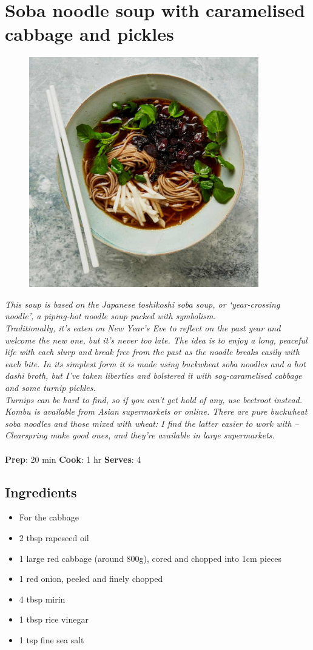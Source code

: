 \documentclass{book}
\begin{document}
\section{Soba noodle soup with caramelised cabbage and pickles}
\begin{figure}
\centering\includegraphics[width=10cm,height=10cm,keepaspectratio]{Recipe_Pictures/Soba_noodle_soup_with_caramelised_cabbage_and_pickles.png}
\end{figure}
\emph{This soup is based on the Japanese toshikoshi soba soup, or ‘year-crossing noodle’, a piping-hot noodle soup packed with symbolism.\\ 
Traditionally, it’s eaten on New Year’s Eve to reflect on the past year and welcome the new one, but it’s never too late. The idea is to enjoy a long, peaceful life with each slurp and break free from the past as the noodle breaks easily with each bite. In its simplest form it is made using buckwheat soba noodles and a hot dashi broth, but I’ve taken liberties and bolstered it with soy-caramelised cabbage and some turnip pickles.\\ 
Turnips can be hard to find, so if you can’t get hold of any, use beetroot instead. Kombu is available from Asian supermarkets or online. There are pure buckwheat soba noodles and those mixed with wheat: I find the latter easier to work with – Clearspring make good ones, and they’re available in large supermarkets.}\\\\ 
\textbf{Prep}: 20 min
\textbf{Cook}: 1 hr
\textbf{Serves}: 4
\subsection*{Ingredients}
\begin{itemize}
\item For the cabbage
\item 2 tbsp rapeseed oil 
\item 1 large red cabbage (around 800g), cored and chopped into 1cm pieces 
\item 1 red onion, peeled and finely chopped 
\item 4 tbsp mirin 
\item 1 tbsp rice vinegar 
\item 1 tsp fine sea salt
\end{itemize}
\end{document}

